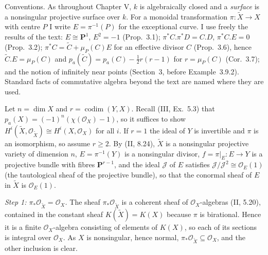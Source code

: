 \documentclass[11pt]{article}
\begin{document}
Conventions. As throughout Chapter V, $k$ is algebraically closed and a \emph{surface} is a nonsingular projective surface over $k$. For a monoidal transformation $\pi:\widetilde X\to X$ with centre $P$ I write $E=\pi^{-1}(P)$ for the exceptional curve. I use freely the results of the text: $E\cong\mathbf P^1$, $E^2=-1$ (Prop.~3.1); $\pi^*C.\pi^*D=C.D$, $\pi^*C.E=0$ (Prop.~3.2); $\pi^*C=\widetilde C+\mu_P(C)E$ for an effective divisor $C$ (Prop.~3.6), hence $\widetilde C.E=\mu_P(C)$ and $p_a(\widetilde C)=p_a(C)-\tfrac12 r(r-1)$ for $r=\mu_P(C)$ (Cor.~3.7); and the notion of infinitely near points (Section~3, before Example~3.9.2). Standard facts of commutative algebra beyond the text are named where they are used.

\pf
Let $n=\dim X$ and $r=\operatorname{codim}(Y,X)$. Recall (III, Ex.~5.3) that $p_a(X)=(-1)^n(\chi(\mathcal O_X)-1)$, so it suffices to show $H^i(\widetilde X,\mathcal O_{\widetilde X})\cong H^i(X,\mathcal O_X)$ for all $i$. If $r=1$ the ideal of $Y$ is invertible and $\pi$ is an isomorphism, so assume $r\ge2$. By (II, 8.24), $\widetilde X$ is a nonsingular projective variety of dimension $n$, $E=\pi^{-1}(Y)$ is a nonsingular divisor, $f=\pi|_E:E\to Y$ is a projective bundle with fibres $\mathbf P^{r-1}$, and the ideal $\mathcal J$ of $E$ satisfies $\mathcal J/\mathcal J^2\cong\mathcal O_E(1)$ (the tautological sheaf of the projective bundle), so that the conormal sheaf of $E$ in $\widetilde X$ is $\mathcal O_E(1)$.

\emph{Step 1: $\pi_*\mathcal O_{\widetilde X}=\mathcal O_X$.} The sheaf $\pi_*\mathcal O_{\widetilde X}$ is a coherent sheaf of $\mathcal O_X$-algebras (II, 5.20), contained in the constant sheaf $K(\widetilde X)=K(X)$ because $\pi$ is birational. Hence it is a finite $\mathcal O_X$-algebra consisting of elements of $K(X)$, so each of its sections is integral over $\mathcal O_X$. As $X$ is nonsingular, hence normal, $\pi_*\mathcal O_{\widetilde X}\subseteq\mathcal O_X$, and the other inclusion is clear.
\end{document}

